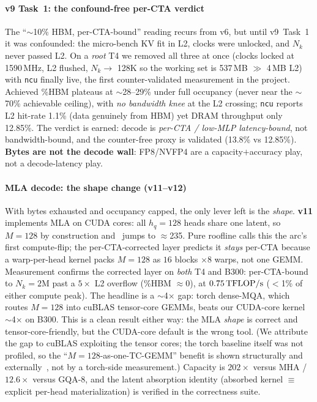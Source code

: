\paragraph{v9 Task~1: the confound-free per-CTA verdict}
The ``$\sim$10\% HBM, per-CTA-bound'' reading recurs from v6, but until v9~Task~1
it was confounded: the micro-bench KV fit in L2, clocks were unlocked, and $N_k$
never passed L2. On a \emph{root} T4 we removed all three at once (clocks locked
at 1590\,MHz, L2 flushed, $N_k \to$ 128K so the working set is 537\,MB $\gg$ 4\,MB
L2) with \texttt{ncu} finally live, the first counter-validated measurement in
the project. Achieved \%HBM plateaus at $\sim$28--29\% under full occupancy (never
near the $\sim$70\% achievable ceiling), with \emph{no bandwidth knee} at the L2
crossing; \texttt{ncu} reports L2 hit-rate 1.1\% (data genuinely from HBM) yet
DRAM throughput only 12.85\%. The verdict is earned: decode is
\emph{per-CTA / low-MLP latency-bound}, not bandwidth-bound, and the counter-free
proxy is validated (13.8\% vs 12.85\%). \textbf{Bytes are not the decode wall}:
FP8/NVFP4 are a capacity$+$accuracy play, not a decode-latency play.

\paragraph{MLA decode: the shape change (v11--v12)}
With bytes exhausted and occupancy capped, the only lever left is the
\emph{shape}. \textbf{v11} implements MLA on CUDA cores: all $h_q{=}128$ heads
share one latent, so $M{=}128$ by construction and \ai\ jumps to $\approx$235.
Pure roofline calls this the arc's first compute-flip; the per-CTA-corrected
layer predicts it \emph{stays} per-CTA because a warp-per-head kernel packs
$M{=}128$ as $16$ blocks $\times 8$ warps, not one GEMM. Measurement confirms the
corrected layer on \emph{both} T4 and B300: per-CTA-bound to $N_k{=}2$M past a
$5\times$ L2 overflow (\%HBM $\approx 0$), at $0.75\,\text{TFLOP/s}$ ($<$1\% of either
compute peak). The headline is a $\sim$4$\times$ gap: torch dense-MQA, which
routes $M{=}128$ into cuBLAS tensor-core GEMMs, beats our CUDA-core kernel
$\sim$4$\times$ on B300. This is a clean result either way: the MLA \emph{shape}
is correct and tensor-core-friendly, but the CUDA-core default is the wrong tool.
(We attribute the gap to cuBLAS exploiting the tensor cores; the torch baseline
itself was not profiled, so the ``$M{=}128$-as-one-TC-GEMM'' benefit is shown
structurally and externally~\cite{gla}, not by a torch-side measurement.)
Capacity is $202\times$ versus MHA / $12.6\times$ versus GQA-8, and the latent
absorption identity (absorbed kernel $\equiv$ explicit per-head materialization)
is verified in the correctness suite.

